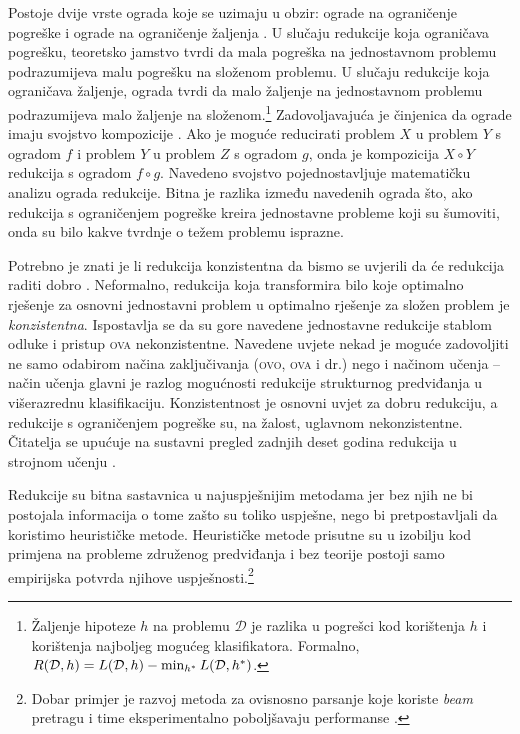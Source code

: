 Postoje dvije vrste ograda koje se uzimaju u obzir: ograde na ograničenje
pogreške  i ograde na ograničenje žaljenja . U slučaju redukcije koja ograničava pogrešku, teoretsko jamstvo tvrdi
da mala pogreška na jednostavnom problemu podrazumijeva malu pogrešku na složenom
problemu. U slučaju redukcije koja ograničava žaljenje, ograda tvrdi da malo
žaljenje na jednostavnom problemu podrazumijeva malo žaljenje na
složenom.\footnote{Žaljenje hipoteze $h$ na problemu $\mathcal{D}$ je razlika u
pogrešci kod korištenja $h$ i korištenja najboljeg mogućeg klasifikatora.
Formalno, $R(\mathcal{D}, h) = L(\mathcal{D}, h) - \min_{h\ssymbol{1}}
L(\mathcal{D}, h\ssymbol{1})$.} Zadovoljavajuća je činjenica da ograde imaju
svojstvo kompozicije \citep{beygelzimer2005error}. Ako je moguće reducirati
problem $X$ u problem $Y$ s ogradom $f$ i problem $Y$ u problem $Z$ s ogradom
$g$, onda je kompozicija $X \circ Y$ redukcija s ogradom $f \circ g$. Navedeno
svojstvo pojednostavljuje matematičku analizu ograda redukcije. Bitna je razlika
između navedenih ograda što, ako redukcija s ograničenjem pogreške kreira
jednostavne probleme koji su šumoviti, onda su bilo kakve tvrdnje o težem
problemu isprazne.

Potrebno je znati je li redukcija konzistentna  da bismo se
uvjerili da će redukcija raditi dobro \citep{beygelzimer2009error,
daume15reductions}. Neformalno, redukcija koja transformira bilo koje optimalno
rješenje za osnovni jednostavni problem u optimalno rješenje za složen
problem je \textit{konzistentna}. Ispostavlja se da su gore navedene jednostavne
redukcije stablom odluke i pristup \textsc{ova} nekonzistentne. Navedene uvjete
nekad je moguće zadovoljiti ne samo odabirom načina zaključivanja (\textsc{ovo},
\textsc{ova} i dr.) nego i načinom učenja \citep{abe2004iterative,
beygelzimer2005weighted} -- način učenja glavni je razlog mogućnosti redukcije
strukturnog predviđanja u višerazrednu klasifikaciju. Konzistentnost je osnovni
uvjet za dobru redukciju, a redukcije s ograničenjem pogreške su, na žalost,
uglavnom nekonzistentne. Čitatelja se upućuje na sustavni pregled zadnjih deset
godina redukcija u strojnom učenju \citep{daume15reductions}.

Redukcije su bitna sastavnica u najuspješnijim metodama \lts{} jer bez njih ne
bi postojala informacija o tome zašto su toliko uspješne, nego bi
pretpostavljali da koristimo heurističke metode. Heurističke metode prisutne su
u izobilju kod primjena na probleme združenog predviđanja i bez teorije postoji
samo empirijska potvrda njihove uspješnosti.\footnote{Dobar primjer je razvoj
metoda za ovisnosno parsanje koje koriste \textit{beam} pretragu i time
eksperimentalno poboljšavaju performanse \citep{zhang2011transition,
bohnet2012transition}.}
